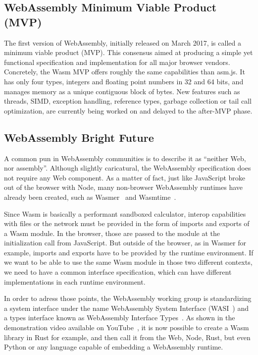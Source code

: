 \subsection{WebAssembly Minimum Viable Product (MVP)}%
\label{sub:wasm-mvp}

The first version of WebAssembly, initially released on March 2017,
is called a minimum viable product (MVP).
This consensus aimed at producing a simple yet functional specification and implementation
for all major browser vendors.
Concretely, the Wasm MVP offers roughly the same capabilities than asm.js.
It has only four types, integers and floating point numbers in 32 and 64 bits,
and manages memory as a unique contiguous block of bytes.
New features such as threads,
SIMD, exception handling, reference types, garbage collection or tail call optimization,
are currently being worked on and delayed to the after-MVP phase.

\subsection{WebAssembly Bright Future}%
\label{sub:wasm-future}

A common pun in WebAssembly communities is to describe it as ``neither Web, nor assembly''.
Although slightly caricatural, the WebAssembly specification does not require any Web component.
As a matter of fact, just like JavaScript broke out of the browser with Node,
many non-browser WebAssembly runtimes have already been created, such as Wasmer~\cite{wasmer}
and Wasmtime~\cite{wasmtime}.

Since Wasm is basically a performant sandboxed calculator,
interop capabilities with files or the network
must be provided in the form of imports and exports of a Wasm module.
In the browser, those are passed to the module at the initialization call from JavaScript.
But outside of the browser, as in Wasmer for example,
imports and exports have to be provided by the runtime environment.
If we want to be able to use the same Wasm module in those two different contexts,
we need to have a common interface specification,
which can have different implementations in each runtime environment.

In order to adress those points, the WebAssembly working group
is standardizing a system interface under the name
WebAssembly System Interface (WASI~\cite{wasi}) and a types interface
known as WebAssembly Interface Types~\cite{wait}.
As shown in the demonstration video available on YouTube~\cite{waitvideo},
it is now possible to create a Wasm library in Rust for example,
and then call it from the Web, Node, Rust, but even Python or any language
capable of embedding a WebAssembly runtime.


